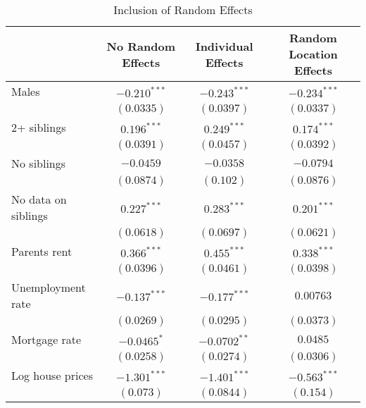 \begin{table}[htpb]
\centering
\caption{Inclusion of Random Effects} 
\label{random_res}
\begin{tabular}{lccc}
  \toprule
\parbox[t]{0.25\textwidth}{\centering } & \parbox[t]{0.14\textwidth}{\centering No Random Effects} & \parbox[t]{0.14\textwidth}{\centering Individual Effects} & \parbox[t]{0.14\textwidth}{\centering Random Location Effects} \\ 
  \midrule
Males & $-0.210^{***}$ & $-0.243^{***}$ & $-0.234^{***}$ \\ 
   & $(0.0335)$ & $(0.0397)$ & $(0.0337)$ \\ 
  2+ siblings & $0.196^{***}$ & $0.249^{***}$ & $0.174^{***}$ \\ 
   & $(0.0391)$ & $(0.0457)$ & $(0.0392)$ \\ 
  No siblings & $-0.0459$ & $-0.0358$ & $-0.0794$ \\ 
   & $(0.0874)$ & $(0.102)$ & $(0.0876)$ \\ 
  No data on siblings & $0.227^{***}$ & $0.283^{***}$ & $0.201^{***}$ \\ 
   & $(0.0618)$ & $(0.0697)$ & $(0.0621)$ \\ 
  Parents rent & $0.366^{***}$ & $0.455^{***}$ & $0.338^{***}$ \\ 
   & $(0.0396)$ & $(0.0461)$ & $(0.0398)$ \\ 
  Unemployment rate & $-0.137^{***}$ & $-0.177^{***}$ & $0.00763$ \\ 
   & $(0.0269)$ & $(0.0295)$ & $(0.0373)$ \\ 
  Mortgage rate & $-0.0465^{*}$ & $-0.0702^{**}$ & $0.0485$ \\ 
   & $(0.0258)$ & $(0.0274)$ & $(0.0306)$ \\ 
  Log house prices & $-1.301^{***}$ & $-1.401^{***}$ & $-0.563^{***}$ \\ 
   & $(0.073)$ & $(0.0844)$ & $(0.154)$ \\ 
   \bottomrule
\end{tabular}
\end{table}
